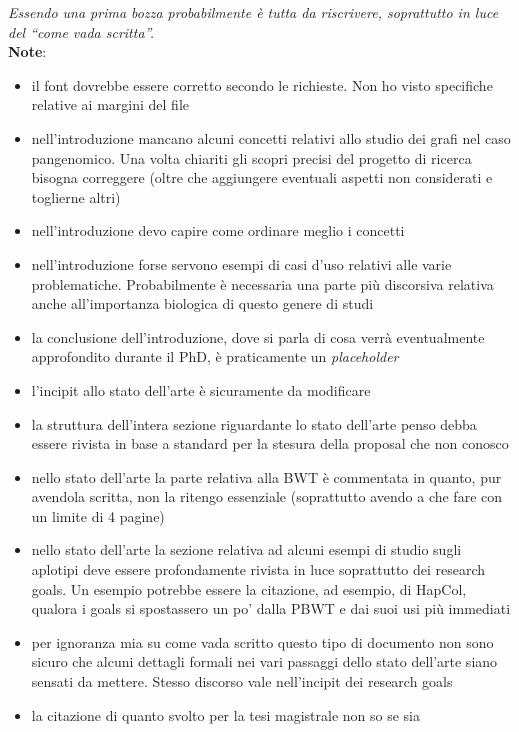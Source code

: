 \documentclass[a4paper,11pt, oneside]{article}
\begin{document}
\begin{shaded}
  \noindent
  \textit{Essendo una prima bozza probabilmente è tutta da riscrivere,
  soprattutto in luce del ``come vada scritta''.}\\
  \textbf{Note}:
  \begin{itemize}
    \item il font dovrebbe essere corretto secondo le richieste. Non ho visto
    specifiche relative ai margini del file
    \item nell'introduzione mancano alcuni concetti relativi allo
    studio dei grafi nel caso pangenomico. Una volta chiariti gli scopri precisi
    del progetto di ricerca bisogna correggere (oltre che aggiungere eventuali
    aspetti non considerati e toglierne altri)
    \item nell'introduzione devo capire come ordinare meglio i concetti
    \item nell'introduzione forse servono esempi di casi d'uso relativi alle
    varie problematiche. Probabilmente è necessaria una parte più discorsiva
    relativa anche all'importanza biologica di questo genere di studi
    \item la conclusione dell'introduzione, dove si parla di cosa verrà
    eventualmente approfondito durante il PhD, è praticamente un
    \textit{placeholder}  
    \item l'incipit allo stato dell'arte è sicuramente da modificare
    \item la struttura dell'intera sezione riguardante lo stato dell'arte penso
    debba essere rivista in base a standard per la stesura della proposal che
    non conosco
    \item nello stato dell'arte la parte relativa alla BWT è commentata in
    quanto, pur avendola scritta, non la ritengo essenziale (soprattutto avendo
    a che fare con un limite di 4 pagine)
    \item nello stato dell'arte la sezione relativa ad alcuni esempi di studio
    sugli aplotipi deve essere profondamente rivista in luce soprattutto dei
    research goals. Un esempio potrebbe essere la citazione, ad esempio, di
    HapCol, qualora i goals si spostassero un po' dalla PBWT e dai suoi usi più
    immediati 
    \item per ignoranza mia su come vada scritto questo tipo di documento non
    sono sicuro che alcuni dettagli formali nei vari passaggi dello stato
    dell'arte siano sensati da mettere. Stesso discorso vale nell'incipit dei
    research goals
    \item la citazione di quanto svolto per la tesi magistrale non so se sia

\end{itemize}
\end{shaded}
\end{document}
